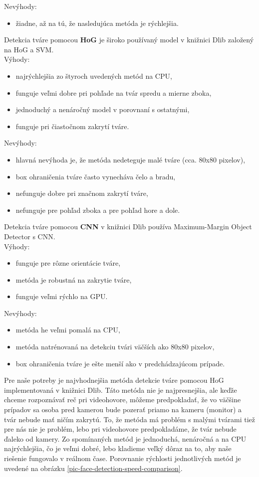 Nevýhody:
\begin{itemize}
	\item žiadne, až na tú, že nasledujúca metóda je rýchlejšia.\\
\end{itemize}
Detekcia tváre pomocou \textbf{HoG} je široko používaný model v knižnici Dlib založený na HoG a SVM.\\
Výhody:
\begin{itemize}
	\item najrýchlejšia zo štyroch uvedených metód na CPU,
	\item funguje veľmi dobre pri pohľade na tvár spredu a mierne zboka,
	\item jednoduchý a nenáročný model v porovnaní s ostatnými,
	\item funguje pri čiastočnom zakrytí tváre.
\end{itemize}
Nevýhody:
\begin{itemize}
	\item hlavná nevýhoda je, že metóda nedeteguje malé tváre (cca. 80x80 pixelov),
	\item box ohraničenia tváre často vynecháva čelo a bradu,
	\item nefunguje dobre pri značnom zakrytí tváre,
	\item nefunguje pre pohľad zboka a pre pohľad hore a dole.\\
\end{itemize}
Detekcia tváre pomocou \textbf{CNN} v knižnici Dlib používa Maximum-Margin Object Detector s CNN.\\
Výhody:
\begin{itemize}
	\item funguje pre rôzne orientácie tváre,
	\item metóda je robustná na zakrytie tváre,
	\item funguje veľmi rýchlo na GPU.
\end{itemize}
Nevýhody:
\begin{itemize}
	\item metóda he veľmi pomalá na CPU,
	\item metóda natrénovaná na detekciu tvári väčších ako 80x80 pixelov,
	\item box ohraničenia tváre je ešte menší ako v predchádzajúcom prípade.\\
\end{itemize}

Pre naše potreby je najvhodnejšia metóda detekcie tváre pomocou HoG implementovaná v knižnici Dlib.
Táto metóda nie je najpresnejšia, ale keďže chceme rozpoznávať reč pri videohovore, môžeme predpokladať, že vo väčšine prípadov sa osoba pred kamerou bude pozerať priamo na kameru (monitor) a tvár  nebude mať ničím zakrytú.
To, že metóda má problém s malými tvárami tiež pre nás nie je problém, lebo pri videohovore predpokladáme, že tvár nebude ďaleko od kamery.
Zo spomínaných metód je jednoduchá, nenáročná a na CPU najrýchlejšia, čo je veľmi dobré, lebo kladieme veľký dôraz na to, aby naše riešenie fungovalo v reálnom čase.
Porovnanie rýchlosti jednotlivých metód je uvedené na obrázku \ref{pic-face-detection-speed-comparison}.

